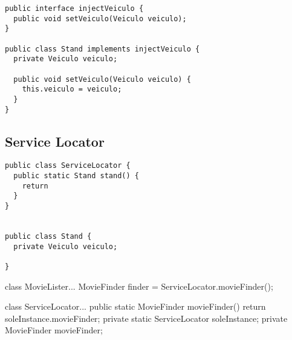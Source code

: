 \begin{lstlisting}[caption=Injeção pela Interface]
public interface injectVeiculo {
  public void setVeiculo(Veiculo veiculo);
}

public class Stand implements injectVeiculo {
  private Veiculo veiculo;

  public void setVeiculo(Veiculo veiculo) {
    this.veiculo = veiculo;
  }
}
\end{lstlisting}

\subsection{Service Locator}

\begin{lstlisting}[caption=Injeção por Service Locator]
public class ServiceLocator {
  public static Stand stand() {
    return
  }
}


public class Stand {
  private Veiculo veiculo;

}
\end{lstlisting}


class MovieLister...
  MovieFinder finder = ServiceLocator.movieFinder();

class ServiceLocator...
  public static MovieFinder movieFinder() {
      return soleInstance.movieFinder;
  }
  private static ServiceLocator soleInstance;
  private MovieFinder movieFinder;
